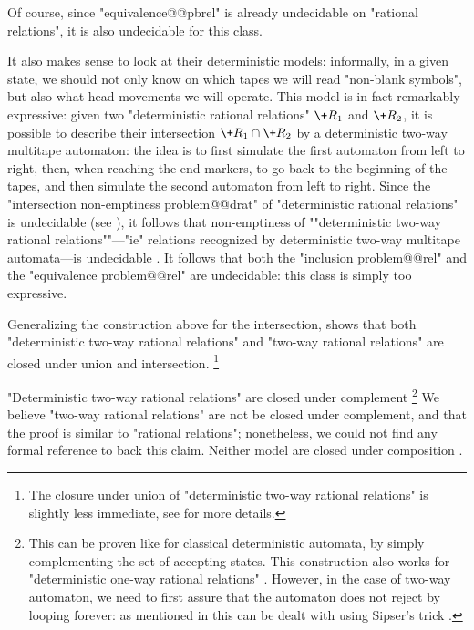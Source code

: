 Of course, since "equivalence@@pbrel" is already undecidable on "rational relations", it is also
undecidable for this class.

It also makes sense to look at their deterministic models: informally, in a given state, we
should not only know on which tapes we will read "non-blank symbols",
but also what head movements we will operate.
This model is in fact remarkably expressive: given two "deterministic rational relations"
$\+R_1$ and $\+R_2$, it is possible to describe their intersection $\+R_1 \cap \+R_2$
by a deterministic two-way multitape automaton: the idea is to first simulate the first automaton
from left to right, then, when reaching the end markers, to go back to the beginning of the tapes,
and then simulate the second automaton from left to right.
Since the "intersection non-emptiness problem@@drat"
of "deterministic rational relations" is undecidable (see ),
it follows that non-emptiness of \AP""deterministic two-way rational relations""---"ie"
relations recognized by deterministic two-way multitape automata---is undecidable
\cite[Theorem~19]{RabinScott1959FiniteAutomata}.
It follows that both the "inclusion problem@@rel" and the "equivalence problem@@rel" are
undecidable: this class is simply too expressive.

Generalizing the construction above for the intersection, shows that
both "deterministic two-way rational relations" and "two-way rational relations"
are closed under union and intersection.%
\footnote{The closure under union of "deterministic two-way rational relations"
is slightly less immediate, see \cite[Lemma~4]{CartonExibardSerre2017TwoWayTwoTapeAutomata}
for more details.}

"Deterministic two-way rational relations" are closed under complement%
\footnote{This can be proven like for classical deterministic automata, by simply complementing
the set of accepting states. This construction also works
for "deterministic one-way rational relations" \cite[Theorem~17]{RabinScott1959FiniteAutomata}.
However, in the case of two-way automaton,
we need to first assure that the automaton does not reject by looping
forever: as mentioned in \cite[Lemma~4]{CartonExibardSerre2017TwoWayTwoTapeAutomata}
this can be dealt with using Sipser's trick \cite[Theorem~1]{Sipser1980HaltingSpaceBoundedComputations}.}
We believe "two-way rational relations" are not be closed under complement,
and that the proof is similar to "rational relations"; nonetheless, we could not find
any formal reference to back this claim.
Neither model are closed under composition \cite[Theorem~5]{CartonExibardSerre2017TwoWayTwoTapeAutomata}.

